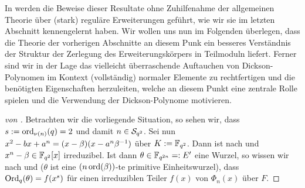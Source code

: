 In \autocites{scheerhorn:1996}{scheerhorn:1997} werden die Beweise dieser
Resultate ohne Zuhilfenahme der allgemeinen Theorie über (stark) reguläre
Erweiterungen geführt, wie wir sie im letzten Abschnitt kennengelernt haben.
Wir wollen uns nun im Folgenden überlegen, dass die Theorie der vorherigen
Abschnitte an diesem Punk ein besseres Verständnis der Struktur der Zerlegung 
des Erweiterungskörpers in Teilmoduln liefert. Ferner sind wir in der Lage
das vielleicht überraschende Auftauchen von Dickson-Polynomen im Kontext
(vollständig) normaler Elemente zu rechtfertigen und die benötigten 
Eigenschaften herzuleiten, welche an diesem Punkt eine zentrale Rolle spielen
und die Verwendung der Dickson-Polynome motivieren.

\begin{proof}[von ]
  Betrachten wir die vorliegende Situation, so sehen wir, dass
  $s := \ord_{\nu(n)}(q) = 2$ und damit $n \in \S_{q^2}$.
  Sei nun 
  $x^2-bx+a^n = (x -\beta)(x -a^n\beta\inv)$ über $K := \F_{q^2}$.
  Dann ist 
  nach  und  
  $x^n-\beta \in \F_{q^2}[x]$ irreduzibel.
  Ist dann $\theta \in \F_{q^{2n}} =: E'$ eine Wurzel, so wissen wir nach
   und 
  ($\theta$ ist eine $(n\ord(\beta))$-te primitive Einheitswurzel), dass
  $\Ord_q(\theta) = f(x^s)$ für einen irreduziblen Teiler $f(x)$ von
  $\Phi_n(x)$ über $F$. 
  

\end{proof}
